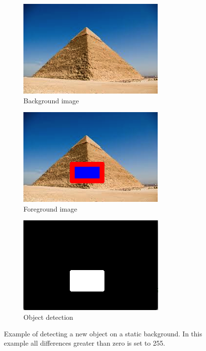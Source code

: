 \begin{figure}
        \centering
        \begin{subfigure}[b]{0.3\textwidth}
                \includegraphics[scale = 0.35]{img/pyramid}
                \caption{Background image}
        \end{subfigure}
		\quad
        \begin{subfigure}[b]{0.3\textwidth}
                \includegraphics[scale = 0.35]{img/pyramid_new}
                \caption{Foreground image}
        \end{subfigure}
        \begin{subfigure}[b]{0.3\textwidth}
                \includegraphics[scale = 0.35]{img/pyramid_object}
                \caption{Object detection}
        \end{subfigure}
		\caption{Example of detecting a new object on a static background. In this example all differences greater than zero is set to 255.}
		\label{fig:background_filtering}
\end{figure}

\newpage

